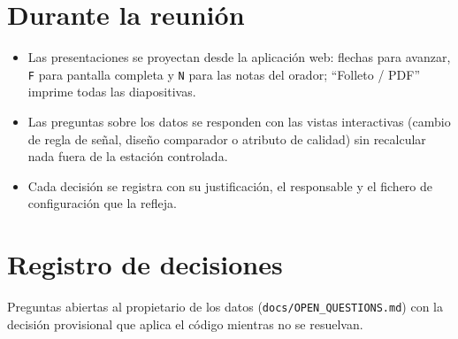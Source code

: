 \documentclass[11pt]{article}
\begin{document}
\section{Durante la reunión}
\begin{itemize}[leftmargin=*]
\item Las presentaciones se proyectan desde la aplicación web: flechas para avanzar, \texttt{F} para
  pantalla completa y \texttt{N} para las notas del orador; ``Folleto / PDF'' imprime todas las
  diapositivas.
\item Las preguntas sobre los datos se responden con las vistas interactivas (cambio de regla de
  señal, diseño comparador o atributo de calidad) sin recalcular nada fuera de la estación
  controlada.
\item Cada decisión se registra con su justificación, el responsable y el fichero de configuración
  que la refleja.
\end{itemize}

\section{Registro de decisiones}\label{sec:decisiones}
Preguntas abiertas al propietario de los datos (\nolinkurl{docs/OPEN_QUESTIONS.md}) con la decisión
provisional que aplica el código mientras no se resuelvan.
\end{document}
